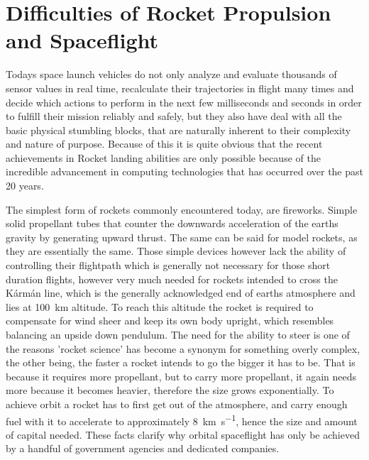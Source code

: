 \section{Difficulties of Rocket Propulsion and Spaceflight}
\author{Sebastian Schaffler} 

Todays space launch vehicles do not only analyze and evaluate thousands of sensor values in real time, recalculate their trajectories in flight many times and decide which actions to perform in the next few milliseconds and seconds in order to fulfill their mission reliably and safely, but they also have deal with all the basic physical stumbling blocks, that are naturally inherent to their complexity and nature of purpose. Because of this it is quite obvious that the recent achievements in Rocket landing abilities are only possible because of the incredible advancement in computing technologies that has occurred over the past 20 years. 

The simplest form of rockets commonly encountered today, are fireworks. Simple solid propellant tubes that counter the downwards acceleration of the earths gravity by generating upward thrust. The same can be said for model rockets, as they are essentially the same. Those simple devices however lack the ability of controlling their flightpath which is generally not necessary for those short duration flights, however very much needed for rockets intended to cross the Kármán line, which is the generally acknowledged end of earths atmosphere and lies at \SI{100}{\kilo\meter} altitude. To reach this altitude the rocket is required to compensate for wind sheer and keep its own body upright, which resembles balancing an upside down pendulum. The need for the ability to steer is one of the reasons 'rocket science' has become a synonym for something overly complex, the other being, the faster a rocket intends to go the bigger it has to be. That is because it requires more propellant, but to carry more propellant, it again needs more because it becomes heavier, therefore the size grows exponentially. To achieve orbit a rocket has to first get out of the atmosphere, and carry enough fuel with it to accelerate to approximately \SI{8}{\kilo\meter\per\second}, hence the size and amount of capital needed. These facts clarify why orbital spaceflight has only be achieved by a handful of government agencies and dedicated companies.


